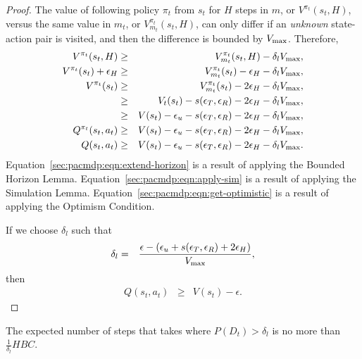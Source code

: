 \begin{proof}
The value of following policy $\pi_t$ from $s_t$ for $H$ steps in $m$, or $V^{\pi_t}(s_t,H)$, versus the same value in $m_t$, or $V^{\pi_t}_{m_t}(s_t,H)$, can only differ if an \emph{unknown} state-action pair is visited, and then the difference is bounded by $V_{\rm max}$. Therefore,
\begin{eqnarray}
V^{\pi_t}(s_t,H) &\geq& V^{\pi_t}_{m_t}(s_t,H) - \delta_lV_{\rm max},\\
\label{sec:pacmdp:eqn:extend-horizon}
V^{\pi_t}(s_t) + \epsilon_H  &\geq& V^{\pi_t}_{m_t}(s_t) - \epsilon_H - \delta_lV_{\rm max},\\
V^{\pi_t}(s_t) &\geq& V^{\pi_t}_{m_t}(s_t) - 2\epsilon_H - \delta_lV_{\rm max},\\
\label{sec:pacmdp:eqn:apply-sim}
 &\geq& V_t(s_t) - s(\epsilon_T,\epsilon_R) -2 \epsilon_H - \delta_lV_{\rm max},\\
\label{sec:pacmdp:eqn:get-optimistic}
 &\geq& V(s_t) - \epsilon_u - s(\epsilon_T,\epsilon_R) -2 \epsilon_H - \delta_lV_{\rm max},\\
Q^{\pi_t}(s_t,a_t) &\geq& V(s_t) - \epsilon_u - s(\epsilon_T,\epsilon_R) -2 \epsilon_H - \delta_lV_{\rm max},\\
Q(s_t,a_t) &\geq& V(s_t) - \epsilon_u - s(\epsilon_T,\epsilon_R) -2 \epsilon_H - \delta_lV_{\rm max}.
\end{eqnarray}
Equation~\ref{sec:pacmdp:eqn:extend-horizon} is a result of applying the Bounded Horizon Lemma.
Equation~\ref{sec:pacmdp:eqn:apply-sim} is a result of applying the Simulation Lemma.
Equation~\ref{sec:pacmdp:eqn:get-optimistic} is a result of applying the Optimism Condition.


If we choose $\delta_l$ such that
\begin{eqnarray}
\delta_l &=& \frac {\epsilon - (\epsilon_u + s(\epsilon_T,\epsilon_R) +2 \epsilon_H)} {V_{\rm max}},
\end{eqnarray}
then 
\begin{eqnarray}
Q(s_t,a_t) &\geq& V(s_t) - \epsilon.
\end{eqnarray}

\end{proof}

\begin{lemma}
\label{sec:pacmdp:lemma:bad-steps}
The expected number of steps that \A takes where $P(D_t) > \delta_l$ is no more than $\frac 1 {\delta_l} H B C$.
\end{lemma}


